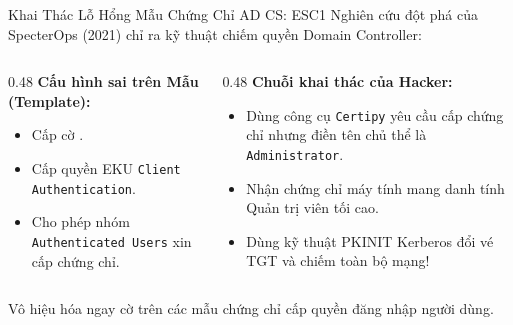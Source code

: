 \begin{frame}{Khai Thác Lỗ Hổng Mẫu Chứng Chỉ AD CS: ESC1}
  Nghiên cứu đột phá của SpecterOps (2021) chỉ ra kỹ thuật chiếm quyền Domain Controller:
  \begin{columns}[T]
    \begin{column}{0.48\textwidth}
      \textbf{Cấu hình sai trên Mẫu (Template):}
      \begin{itemize}\small
        \item Cấp cờ .
        \item Cấp quyền EKU \texttt{Client Authentication}.
        \item Cho phép nhóm \texttt{Authenticated Users} xin cấp chứng chỉ.
      \end{itemize}
    \end{column}
    \begin{column}{0.48\textwidth}
      \textbf{Chuỗi khai thác của Hacker:}
      \begin{itemize}\small
        \item Dùng công cụ \texttt{Certipy} yêu cầu cấp chứng chỉ nhưng điền tên chủ thể là \texttt{Administrator}.
        \item Nhận chứng chỉ máy tính mang danh tính Quản trị viên tối cao.
        \item Dùng kỹ thuật PKINIT Kerberos đổi vé TGT và chiếm toàn bộ mạng!
      \end{itemize}
    \end{column}
  \end{columns}

  \begin{quizbox}
    Vô hiệu hóa ngay cờ  trên các mẫu chứng chỉ cấp quyền đăng nhập người dùng.
  \end{quizbox}
\end{frame}

